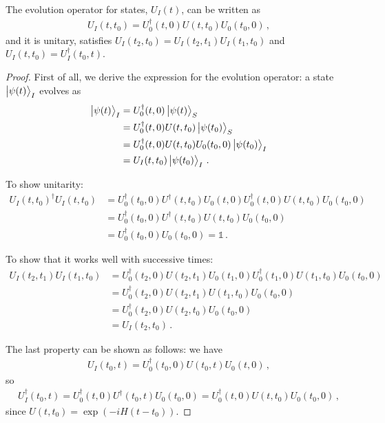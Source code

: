 \documentclass[main.tex]{subfiles}
\begin{document}
\begin{claim}
The evolution operator for states, \(U_I (t)\), can be written as 
%
\begin{align}
U_I (t, t_0 ) = U_0^\dag(t,0)  U (t, t_0 ) U_0 (t_0, 0) 
\,,
\end{align}
%
and it is unitary, satisfies \(U_{I}(t_2, t_0 ) = U_I (t_2 , t_1 ) U_I (t_1 , t_0 )\) and \(U_I (t, t_0 ) = U ^\dag_I (t_0, t)\).  
\end{claim}


\begin{proof}
First of all, we derive the expression for the evolution operator: a state \(\ket{\psi (t)}_{I}\) evolves as
%
\begin{align}
\ket{\psi (t)}_{I} &= U_0 ^\dag (t, 0) \ket{\psi (t)}_{S}  \\
&= U_0 ^\dag (t, 0) U (t, t_0 ) \ket{\psi (t_0 )}_{S}  \\
&= U_0 ^\dag (t, 0) U(t, t_0 ) U_0 (t_0, 0) \ket{\psi (t_0 )}_{I}  \\
&= U_{I} (t, t_0 ) \ket{\psi (t_0 )}_{I}
\,.
\end{align}

To show unitarity: 
%
\begin{align}
U_I (t, t_0 ) ^\dag U_I (t, t_0 )
&= 
U_0 ^\dag(t_0 , 0)  
U ^\dag (t, t_0 )  
U_0 (t, 0) 
U_0 ^\dag (t, 0)  
U (t, t_0 ) 
U_0 (t_0 , 0)  \\
&= 
U_0 ^\dag(t_0 , 0)  
U ^\dag (t, t_0 )  
U (t, t_0 ) 
U_0 (t_0 , 0)  \\
&= 
U_0 ^\dag(t_0 , 0)  
U_0 (t_0 , 0)  
= \mathbb{1}
\,.
\end{align}

To show that it works well with successive times: 
%
\begin{align}
U_I (t_2, t_1 ) U_I (t_1 , t_0 )
&= U_0 ^\dag (t_2 , 0) U (t_2, t_1 ) U_0 (t_1, 0)
U_0 ^\dag (t_1, 0) U(t_1, t_0 ) U_0 (t_0, 0)  \\
&= U_0 ^\dag (t_2 , 0) U (t_2, t_1 ) U(t_1, t_0 ) U_0 (t_0, 0)  \\
&= U_0 ^\dag (t_2 , 0) U (t_2, t_0 ) U_0 (t_0, 0)  \\
&= U_I (t_2, t_0 )
\,.
\end{align}

The last property can be shown as follows: we have
%
\begin{align}
U_I (t_0, t) = U_0 ^\dag (t_0 , 0) U(t_0, t) U_0 (t ,0 )
\,,
\end{align}
%
so 
%
\begin{align}
U_I ^\dag (t_0, t) 
= U_0 ^\dag (t, 0) U ^\dag (t_0 , t) U_0 (t_0, 0) 
= U_0 ^\dag (t, 0) U (t , t_0 ) U_0 (t_0, 0) 
\,,
\end{align}
%
since \(U(t, t_0 ) = \exp(-i H (t - t_0) )\). 
\end{proof}
\end{document}
